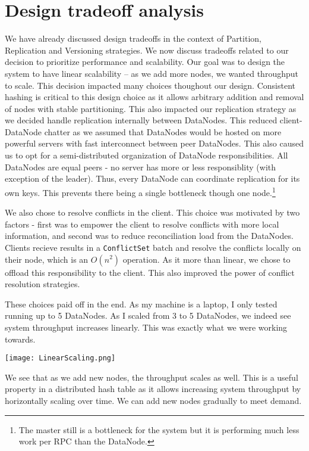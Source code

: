 \documentclass[paper=a4,fontsize=11pt]{report} %
\numberwithin{equation}{section} %
\numberwithin{figure}{section} %
\numberwithin{table}{section} %
\begin{document}
\section{Design tradeoff analysis}
We have already discussed design tradeoffs in the context of Partition, Replication and Versioning strategies. We now discuss tradeoffs related to our decision to prioritize performance and scalability. Our goal was to design the system to have linear scalability -- as we add more nodes, we wanted throughput to scale. This decision impacted many choices thoughout our design. Consistent hashing is critical to this design choice as it allows arbitrary addition and removal of nodes with stable partitioning. This also impacted our replication strategy as we decided handle replication internally between DataNodes. This reduced client-DataNode chatter as we assumed that DataNodes would be hosted on more powerful servers with fast interconnect between peer DataNodes. This also caused us to opt for a semi-distributed organization of DataNode responsibilities. All DataNodes are equal peers - no server has more or less responsiblity (with exception of the leader). Thus, every DataNode can coordinate replication for its own keys. This prevents there being a single bottleneck though one node.\footnote{The master still is a bottleneck for the system but it is performing much less work per RPC than the DataNode.}

We also chose to resolve conflicts in the client. This choice was motivated by two factors - first was to empower the client to resolve conflicts with more local information, and second was to reduce reconciliation load from the DataNodes. Clients recieve results in a \texttt{ConflictSet} batch and resolve the conflicts locally on their node, which is an $O(n^2)$ operation. As it more than linear, we chose to offload this responsibility to the client. This also improved the power of conflict resolution
strategies.

These choices paid off in the end. As my machine is a laptop, I only tested running up to 5 DataNodes. As I scaled from 3 to 5 DataNodes, we indeed see system throughput increases linearly. This was exactly what we were working towards.

\noindent\texttt{[image: LinearScaling.png]}

We see that as we add new nodes, the throughput scales as well. This is a useful property in a distributed hash table as it allows increasing system throughput by horizontally scaling over time. We can add new nodes gradually to meet demand.
\end{document}
